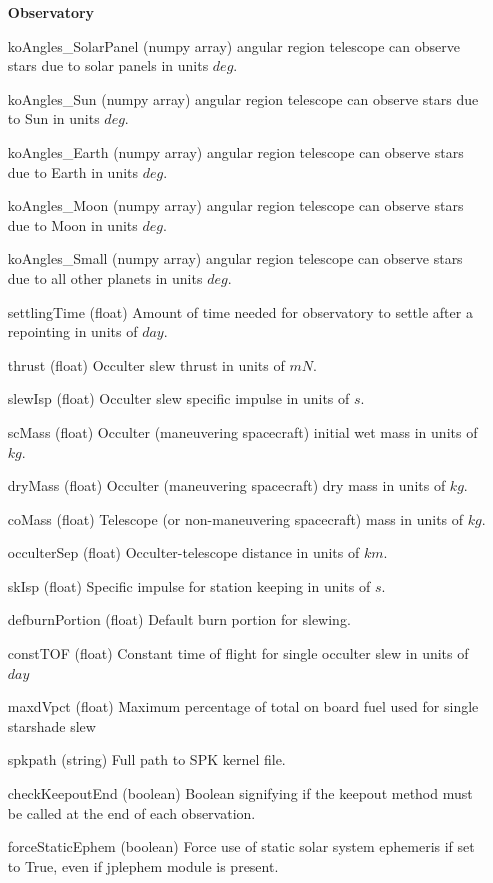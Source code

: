 \documentclass[cleanfoot]{asme2ej}
\begin{document}
\begin{itemize}[leftmargin=1.5in,font={\ttfamily}]
\item[\textbf{Observatory}]
\item[koAngles\_SolarPanel] (numpy array) angular region telescope can observe stars due to solar panels in units $deg$.
\item[koAngles\_Sun] (numpy array) angular region telescope can observe stars due to Sun in units $deg$.
\item[koAngles\_Earth] (numpy array) angular region telescope can observe stars due to Earth in units $deg$.
\item[koAngles\_Moon] (numpy array) angular region telescope can observe stars due to Moon in units $deg$.
\item[koAngles\_Small] (numpy array) angular region telescope can observe stars due to all other planets in units $deg$.
\item[settlingTime] (float) Amount of time needed for observatory to settle after a repointing in units of $ day $.
\item[thrust] (float) Occulter slew thrust in units of $ mN $.
\item[slewIsp] (float) Occulter slew specific impulse in units of $ s $.
\item[scMass] (float) Occulter (maneuvering spacecraft) initial wet mass in units of $ kg $. 
\item[dryMass] (float) Occulter (maneuvering spacecraft) dry mass in units of $ kg $. 
\item[coMass] (float) Telescope (or non-maneuvering spacecraft) mass in units of $ kg $. 
\item[occulterSep] (float) Occulter-telescope distance in units of $ km $. 
\item[skIsp] (float) Specific impulse for station keeping in units of $ s $. 
\item[defburnPortion] (float) Default burn portion for slewing.
\item[constTOF] (float) Constant time of flight for single occulter slew in units of $ day $
\item[maxdVpct] (float) Maximum percentage of total on board fuel used for single starshade slew
\item[spkpath] (string) Full path to SPK kernel file.
\item[checkKeepoutEnd] (boolean) Boolean signifying if the keepout method must be called at the end of each observation.
\item[forceStaticEphem]  (boolean) Force use of static solar system ephemeris if set to True, even if jplephem module is present.


\end{itemize}
\end{document}

